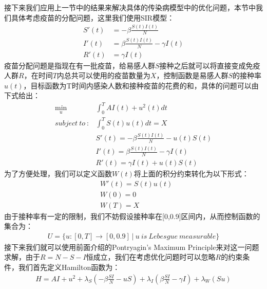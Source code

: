 \documentclass[UTF8]{ctexart}
\begin{document}
		\indent 接下来我们应用上一节中的结果来解决具体的传染病模型中的优化问题，本节中我们具体考虑疫苗的分配问题，这里我们使用SIR模型：
		\begin{equation}\label{basis}
		\begin{split}
		S'(t)&=-\beta \frac{S(t)I(t)}{N}\\
		I'(t)&=\beta \frac{S(t)I(t)}{N}-\gamma I(t)\\
		R'(t)&=\gamma I(t)			
		\end{split}
		\end{equation}
		\indent 疫苗分配问题是指现在有一批疫苗，给易感人群$S$接种之后就可以将直接变成免疫人群$R$，在时间$T$内总共可以使用的疫苗数量为$X$，控制函数是易感人群$S$的接种率$u(t)$，目标函数为T时间内感染人数和接种疫苗的花费的和，具体的问题可以由下式给出：
		\begin{equation}
		\begin{split}
		\min_{u}&\int_{0}^{T}AI(t)+u^2(t)dt\\
		subject \ to \ :&\int_{0}^{T}S(t)u(t)dt=X\\
		&S'(t)=-\beta \frac{S(t)I(t)}{N}-u(t)S(t)\\
		&I'(t)=\beta \frac{S(t)I(t)}{N}-\gamma I(t)\\
		&R'(t)=\gamma I(t)+u(t)S(t)			
		\end{split}
		\end{equation}
		\indent 为了方便处理，我们可以定义函数$W(t)$将上面的积分约束转化为以下形式：
		\begin{equation}
		\begin{aligned}
		&W'(t)=S(t)u(t)\\
		&W(0)=0\\
		&W(T)=X
		\end{aligned}
		\end{equation}
		\indent 由于接种率有一定的限制，我们不妨假设接种率在[0,0.9]区间内，从而控制函数的集合为：
		\begin{equation}
		\begin{aligned}
		U=\{u:[0,T]\rightarrow[0,0.9]\ |\ u\ is \ Lebesgue \ measurable\}
		\end{aligned}
		\end{equation}
		\indent 接下来我们就可以使用前面介绍的Pontryagin's Maximum Principle来对这一问题求解，由于$R=N-S-I$恒成立，我们在考虑优化问题时可以忽略$R$的约束条件，我们首先定义Hamilton函数为：
		\begin{equation}
		\begin{aligned}
		H=AI+u^2+\lambda_{S}(-\beta \frac{SI}{N}-uS)+\lambda_{I}(\beta \frac{SI}{N}-\gamma I)+\lambda_{W}(Su)
		\end{aligned}
		\end{equation}
\end{document}
